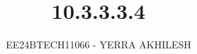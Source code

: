 \documentclass[journal]{IEEEtran}
\begin{document}

\vspace{3cm}

\title{10.3.3.3.4}
\author{EE24BTECH11066 - YERRA AKHILESH}
{\let\newpage\relax\maketitle}

\renewcommand{\thefigure}{\theenumi}
\renewcommand{\thetable}{\theenumi}
\setlength{\intextsep}{10pt} %

\renewcommand{\thetable}{\theenumi}
\end{document}
